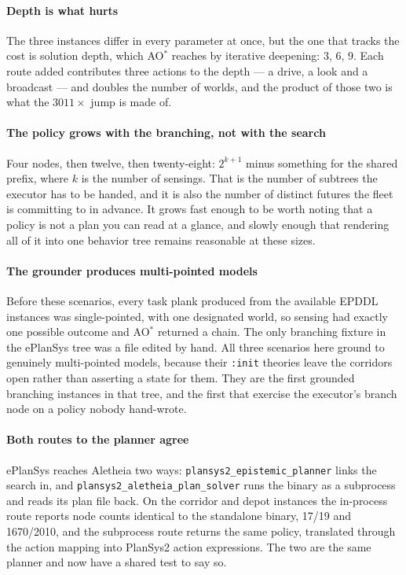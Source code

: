 \documentclass[11pt,a4paper]{article}
\begin{document}
\paragraph{Depth is what hurts} The three instances differ in every parameter at
once, but the one that tracks the cost is solution depth, which AO$^{*}$ reaches
by iterative deepening: 3, 6, 9. Each route added contributes three actions to
the depth --- a drive, a look and a broadcast --- and doubles the number of
worlds, and the product of those two is what the $3011\times$ jump is made of.

\paragraph{The policy grows with the branching, not with the search} Four nodes,
then twelve, then twenty-eight: $2^{k+1}$ minus something for the shared prefix,
where $k$ is the number of sensings. That is the number of subtrees the executor
has to be handed, and it is also the number of distinct futures the fleet is
committing to in advance. It grows fast enough to be worth noting that a policy
is not a plan you can read at a glance, and slowly enough that rendering all of
it into one behavior tree remains reasonable at these sizes.

\paragraph{The grounder produces multi-pointed models} Before these scenarios,
every task \textsf{plank} produced from the available EPDDL instances was
single-pointed, with one designated world, so sensing had exactly one possible
outcome and AO$^{*}$ returned a chain. The only branching fixture in the
ePlanSys tree was a file edited by hand. All three scenarios here ground to
genuinely multi-pointed models, because their \texttt{:init} theories leave the
corridors open rather than asserting a state for them. They are the first
grounded branching instances in that tree, and the first that exercise the
executor's branch node on a policy nobody hand-wrote.

\paragraph{Both routes to the planner agree} ePlanSys reaches Aletheia two ways:
\texttt{plansys2\_epistemic\_\allowbreak planner} links the search in, and
\texttt{plansys2\_aletheia\_\allowbreak plan\_solver} runs the binary as a subprocess and
reads its plan file back. On the corridor and depot instances the in-process
route reports node counts identical to the standalone binary, 17/19 and
1670/2010, and the subprocess route returns the same policy, translated through
the action mapping into PlanSys2 action expressions. The two are the same
planner and now have a shared test to say so.
\end{document}
